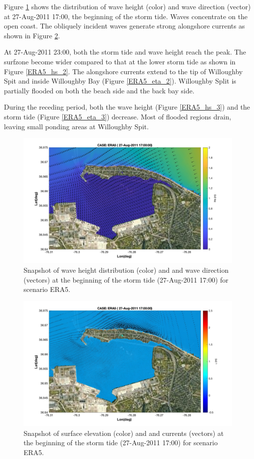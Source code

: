 \documentclass[11pt]{article}
\begin{document}
Figure \ref{ERA5_hs_1} shows the distribution of wave height (color) and wave direction (vector) at 27-Aug-2011 17:00, the beginning of the storm tide. Waves concentrate on the open coast. The obliquely incident waves generate strong alongshore currents as shown in Figure \ref{ERA5_eta_1}.

 At  27-Aug-2011 23:00, both the storm tide and wave height reach the peak. The surfzone become wider compared to that at the lower storm tide as shown in Figure \ref{ERA5_hs_2}. The alongshore currents extend to the tip of Willoughby Spit and inside Willoughby Bay (Figure \ref{ERA5_eta_2}). Willoughby Split is partially flooded on both the beach side and the back bay side. 
 
 During the receding period, both the wave height (Figure \ref{ERA5_hs_3}) and the storm tide (Figure \ref{ERA5_eta_3}) decrease. Most of flooded regions drain, leaving small ponding areas at Willoughby Spit.   

\begin{figure}[h!]
\centering
\includegraphics[width=\textwidth]{./figures/nearcom_hs_ERA5_55.jpg}
\caption{Snapshot of wave height distribution (color) and and wave direction (vectors) at the beginning of the storm tide (27-Aug-2011 17:00) for scenario ERA5.}
\label{ERA5_hs_1}
\centering
\end{figure}

\begin{figure}[h!]
\centering
\includegraphics[width=\textwidth]{./figures/nearcom_ele_ERA5_55.jpg}
\caption{Snapshot of surface elevation (color) and and currents (vectors) at the beginning of the storm tide (27-Aug-2011 17:00) for scenario ERA5.}
\label{ERA5_eta_1}
\centering
\end{figure}
\end{document}
